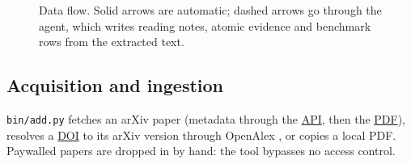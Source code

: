 \documentclass[11pt,a4paper]{article}
\newcommand{\cmd}[1]{\texttt{#1}}
\newcommand{\gl}[2]{\hyperlink{gl:#1}{\textcolor{glcolor}{#2}}}
\begin{document}
\begin{figure}[ht]
\caption{Data flow. Solid arrows are automatic; dashed arrows go through the agent, which
writes reading notes, atomic evidence and benchmark rows from the extracted text.}
\label{fig:pipeline}
\end{figure}

\subsection{Acquisition and ingestion}

\cmd{bin/add.py} fetches an arXiv paper (metadata through the \gl{API}{API}, then the \gl{PDF}{PDF}), resolves a
\gl{DOI}{DOI} to its arXiv version through OpenAlex \citep{priem2022openalex}, or copies a local PDF.
Paywalled papers are dropped in by hand: the tool bypasses no access control.
\end{document}
